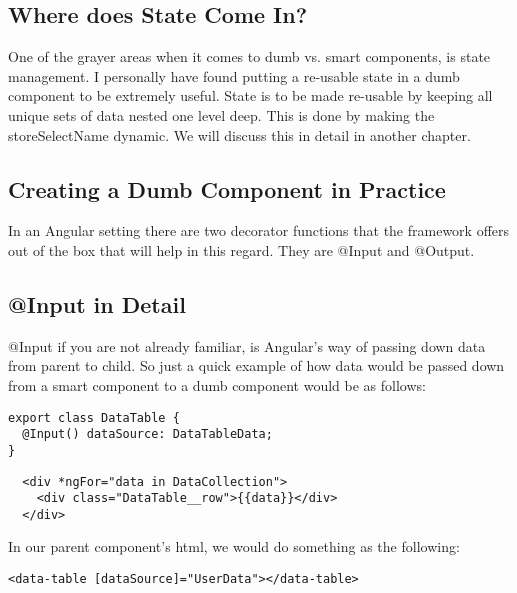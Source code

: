\subsection{ Where does State Come In? }
One of the grayer areas when it comes to dumb vs. smart components, is state
management. I personally have found putting a re-usable state in a dumb
component to be extremely useful. State is to be made re-usable by keeping all
unique sets of data nested one level deep. This is done by making the
storeSelectName dynamic. We will discuss this in detail in another chapter.

\subsection{Creating a Dumb Component in Practice}
In an Angular setting there are two decorator functions that the framework
offers out of the box that will help in this regard. They are @Input and
@Output.

\subsection{@Input in Detail}
@Input if you are not already familiar, is Angular's way of passing down data
from parent to child. So just a quick example of how data would be passed down
from a smart component to a dumb component would be as follows:
\begin{lstlisting}
export class DataTable {
  @Input() dataSource: DataTableData;
}
\end{lstlisting}
\begin{verbatim}
  <div *ngFor="data in DataCollection">
    <div class="DataTable__row">{{data}}</div>
  </div>
\end{verbatim}

In our parent component's html, we would do something as the following:
\begin{lstlisting}
<data-table [dataSource]="UserData"></data-table>
\end{lstlisting}



